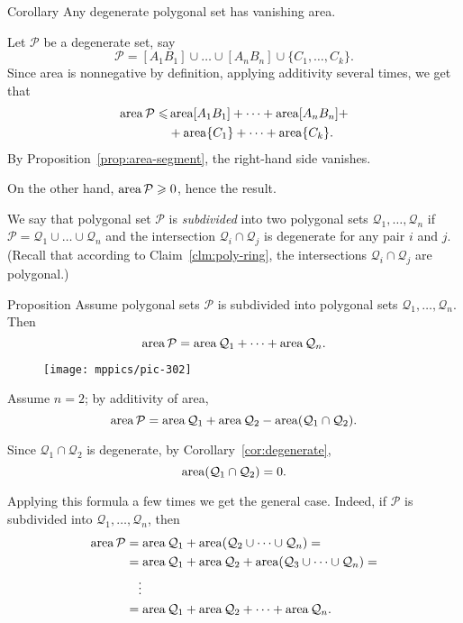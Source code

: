 {\begin{thm}{Corollary}\label{cor:degenerate}
Any degenerate polygonal set has vanishing area.
\end{thm}

Let $\mathcal P$ be a degenerate set,
say
\[\mathcal{P}=[A_1B_1]\cup\dots\cup[A_nB_n]\cup\{C_1,\dots,C_k\}.\]
Since area is nonnegative by definition, applying additivity several times, we get that
\begin{align*}
\mathop{\rm area}\nolimits\mathcal{P}\leqslant
& \mathop{\rm area}\nolimits[A_1B_1]+\dots+\mathop{\rm area}\nolimits[A_nB_n]+
\\
&+\mathop{\rm area}\nolimits\{C_1\}+\dots+\mathop{\rm area}\nolimits\{C_k\}.
\end{align*}
By Proposition~\ref{prop:area-segment}, the right-hand side vanishes.

On the other hand, 
$\mathop{\rm area}\nolimits\mathcal{P}\geqslant 0$,
hence the result.
\qeds

We say that polygonal set $\mathcal{P}$ is \emph{subdivided} 
into two polygonal sets $\mathcal{Q}_1,\dots,\mathcal{Q}_n$ 
if $\mathcal{P}=\mathcal{Q}_1\cup\dots\cup \mathcal{Q}_n$ 
and the intersection $\mathcal{Q}_i\cap\mathcal{Q}_j$ is degenerate for any pair $i$ and $j$.
(Recall that according to Claim~\ref{clm:poly-ring},
the intersections $\mathcal{Q}_i\cap\mathcal{Q}_j$ are polygonal.)

\begin{thm}{Proposition}\label{prop:subdivision}
Assume polygonal sets $\mathcal{P}$ is subdivided into polygonal sets $\mathcal{Q}_1,\dots,\mathcal{Q}_n$.
Then 
\[\mathop{\rm area}\nolimits\mathcal{P}=\mathop{\rm area}\nolimits\mathcal{Q}_1+\dots+\mathop{\rm area}\nolimits\mathcal{Q}_n.\]

\end{thm}

\begin{wrapfigure}{r}{24 mm}
\vskip-2mm
\centering
\texttt{[image: mppics/pic-302]}
\end{wrapfigure}

Assume $n=2$; by additivity of area,
\[\mathop{\rm area}\nolimits\mathcal{P}=\mathop{\rm area}\nolimits\mathcal{Q}_1+\mathop{\rm area}\nolimits\mathcal{Q}_2-\mathop{\rm area}\nolimits(\mathcal{Q}_1\cap\mathcal{Q}_2).\]

Since $\mathcal{Q}_1\cap\mathcal{Q}_2$ is degenerate,
by Corollary~\ref{cor:degenerate},
\[\mathop{\rm area}\nolimits(\mathcal{Q}_1\cap\mathcal{Q}_2)=0.\]

Applying this formula a few times we get the general case.
Indeed, if $\mathcal{P}$ is subdivided into $\mathcal{Q}_1,\dots,\mathcal{Q}_n$, then
\begin{align*}
\mathop{\rm area}\nolimits\mathcal{P}&=\mathop{\rm area}\nolimits\mathcal{Q}_1+\mathop{\rm area}\nolimits(\mathcal{Q}_2\cup\dots\cup\mathcal{Q}_n)=
\\
&=\mathop{\rm area}\nolimits\mathcal{Q}_1+\mathop{\rm area}\nolimits \mathcal{Q}_2+\mathop{\rm area}\nolimits( \mathcal{Q}_3\cup\dots\cup\mathcal{Q}_n)=
\\
&\ \ \ \vdots
\\
&=\mathop{\rm area}\nolimits\mathcal{Q}_1+\mathop{\rm area}\nolimits \mathcal{Q}_2+\dots+\mathop{\rm area}\nolimits\mathcal{Q}_n.
\end{align*}
\qedsf

}
